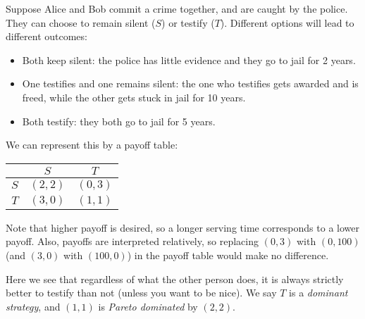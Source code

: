 \documentclass[a4paper]{article}
\begin{document}
\begin{eg}
  Suppose Alice and Bob commit a crime together, and are caught by the police. They can choose to remain silent ($S$) or testify ($T$). Different options will lead to different outcomes:
  \begin{itemize}
    \item Both keep silent: the police has little evidence and they go to jail for 2 years.
    \item One testifies and one remains silent: the one who testifies gets awarded and is freed, while the other gets stuck in jail for 10 years.
    \item Both testify: they both go to jail for 5 years.
  \end{itemize}

  We can represent this by a payoff table:
  \begin{center}
    \begin{tabular}{ccc}
      \toprule
      & $S$ & $T$\\
      \midrule
      $S$ & $(2, 2)$ & $(0, 3)$\\
      $T$ & $(3, 0)$ & $(1, 1)$\\
      \bottomrule
    \end{tabular}
  \end{center}
  Note that higher payoff is desired, so a longer serving time corresponds to a lower payoff. Also, payoffs are interpreted relatively, so replacing $(0, 3)$ with $(0, 100)$ (and $(3, 0)$ with $(100, 0)$) in the payoff table would make no difference.

  Here we see that regardless of what the other person does, it is always strictly better to testify than not (unless you want to be nice). We say $T$ is a \emph{dominant strategy}, and $(1, 1)$ is \emph{Pareto dominated} by $(2, 2)$.
\end{eg}
\end{document}
